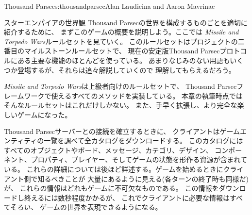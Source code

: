 \begin{aosachapter}{Thousand Parsec}{s:thousandparsec}{Alan Laudicina and Aaron Mavrinac}
\begin{aosasect1}{スターエンパイアの世界観}
Thousand Parsecの世界を構成するものごとを適切に紹介するために、
まずこのゲームの概要を説明しよう。ここでは
\emph{Missile and Torpedo Wars}ルールセットを見ていく。
このルールセットはプロジェクトの二番目のマイルストーンルールセットで、
現在の安定版Thousand Parsecプロトコルにある主要な機能のほとんどを使っている。
あまりなじみのない用語もいくつか登場するが、それらは追々解説していくので
理解してもらえるだろう。

\emph{Missile and Torpedo Wars}は上級者向けのルールセットで、
Thousand Parsecフレームワークで使えるすべてのメソッドを実装している。
本章の執筆時点ではそんなルールセットはこれだけしかない。
また、手早く拡張し、より完全な楽しいゲームになった。

Thousand Parsecサーバーとの接続を確立するときに、
クライアントはゲームエンティティの一覧を調べて全カタログをダウンロードする。
このカタログにはすべてのオブジェクトやボード、メッセージ、カテゴリ、デザイン、
コンポーネント、プロパティ、プレイヤー、そしてゲームの状態を形作る資源が含まれている。
これらの詳細については後ほど詳述する。ゲームを始めるときにクライアント側で知るべきことが
大量にあるように見える(各ターンの終了時も同様だ)が、
これらの情報はどれもゲームに不可欠なものである。
この情報をダウンロードし終えるには数秒程度かかるが、
これでクライアントに必要な情報はすべてそろい、
ゲームの世界を表現できるようになる。


\end{aosasect1}
\end{aosachapter}
